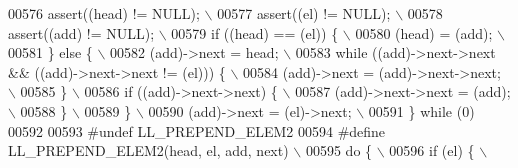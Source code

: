 \begin{DoxyCode}
00576 \textcolor{preprocessor}{  assert((head) != NULL);                                                                      \(\backslash\)}
00577 \textcolor{preprocessor}{  assert((el) != NULL);                                                                        \(\backslash\)}
00578 \textcolor{preprocessor}{  assert((add) != NULL);                                                                       \(\backslash\)}
00579 \textcolor{preprocessor}{  if ((head) == (el)) \{                                                                        \(\backslash\)}
00580 \textcolor{preprocessor}{    (head) = (add);                                                                            \(\backslash\)}
00581 \textcolor{preprocessor}{  \} else \{                                                                                     \(\backslash\)}
00582 \textcolor{preprocessor}{    (add)->next = head;                                                                        \(\backslash\)}
00583 \textcolor{preprocessor}{    while ((add)->next->next && ((add)->next->next != (el))) \{                                 \(\backslash\)}
00584 \textcolor{preprocessor}{      (add)->next = (add)->next->next;                                                         \(\backslash\)}
00585 \textcolor{preprocessor}{    \}                                                                                          \(\backslash\)}
00586 \textcolor{preprocessor}{    if ((add)->next->next) \{                                                                   \(\backslash\)}
00587 \textcolor{preprocessor}{      (add)->next->next = (add);                                                               \(\backslash\)}
00588 \textcolor{preprocessor}{    \}                                                                                          \(\backslash\)}
00589 \textcolor{preprocessor}{  \}                                                                                            \(\backslash\)}
00590 \textcolor{preprocessor}{  (add)->next = (el)->next;                                                                    \(\backslash\)}
00591 \textcolor{preprocessor}{\} while (0)}
00592 
00593 \textcolor{preprocessor}{#undef LL\_PREPEND\_ELEM2}
00594 \textcolor{preprocessor}{#define LL\_PREPEND\_ELEM2(head, el, add, next)                                                  \(\backslash\)}
00595 \textcolor{preprocessor}{do \{                                                                                           \(\backslash\)}
00596 \textcolor{preprocessor}{  if (el) \{                                                                                    \(\backslash\)}

\end{DoxyCode}
